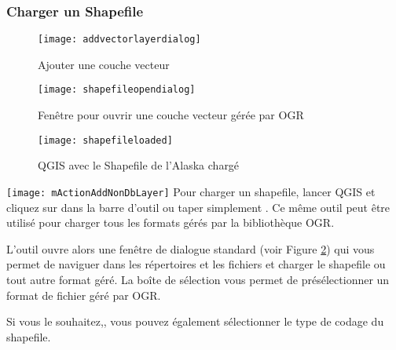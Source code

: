 \subsubsection{Charger un Shapefile}\label{sec:load_shapefile}

\begin{figure}[ht]
   \begin{center}
   \caption{Ajouter une couche vecteur \nixcaption}\label{fig:addvectorlayer}\smallskip
   \texttt{[image: addvectorlayerdialog]}
\end{center} 
\end{figure}

\begin{figure}[ht]
  \begin{center}
  \caption{Fenêtre pour ouvrir une couche vecteur gérée par OGR \nixcaption}\label{fig:openshapefile}\smallskip
  \texttt{[image: shapefileopendialog]}
\end{center}
\end{figure}

\begin{figure}[ht]
  \begin{center}
  \caption{QGIS avec le Shapefile de l'Alaska chargé \nixcaption}\label{fig:loadedshapefile}\smallskip
  \texttt{[image: shapefileloaded]}
\end{center}
\end{figure}

\texttt{[image: mActionAddNonDbLayer]} Pour charger un shapefile, lancer QGIS et cliquez sur  dans la barre d'outil ou taper simplement . Ce même outil peut être utilisé pour charger tous les formats gérés par la bibliothèque OGR.

L'outil ouvre alors une fenêtre de dialogue standard (voir Figure \ref{fig:openshapefile}) qui vous permet de naviguer dans les répertoires et les fichiers et charger le shapefile ou tout autre format géré.
La boîte de sélection  vous permet de présélectionner un format de fichier géré par OGR.

Si vous le souhaitez,, vous pouvez également sélectionner le type de codage du shapefile.

